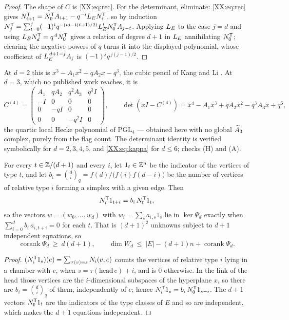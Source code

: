 \begin{proof}
The shape of $C$ is \eqref{XX:eq:rec}. For the determinant, eliminate: \eqref{XX:eq:rec} gives
$N_{i+1}^{\mathsf{T}}=N_0^{\mathsf{T}}A_{i+1}-q^{-i}L_E N_i^{\mathsf{T}}$, so by induction
$N_j^{\mathsf{T}}=\sum_{t=0}^{j}(-1)^{t}q^{-(tj-t(t+1)/2)}L_E^{t}N_0^{\mathsf{T}}A_{j-t}$. Applying $L_E$
to the case $j=d$ and using $L_E N_d^{\mathsf{T}}=q^{\,d}N_0^{\mathsf{T}}$ gives a relation of degree
$d+1$ in $L_E$ annihilating $N_0^{\mathsf{T}}$; clearing the negative powers of $q$ turns it into
the displayed polynomial, whose coefficient of $L_E^{\,d+1-j}A_j$ is
$(-1)^{j}q^{\,j(j-1)/2}$.
\end{proof}

At $d=2$ this is $x^{3}-A_1x^{2}+qA_2x-q^{3}$, the cubic pencil of Kang and Li \cite{KL14}.
At $d=3$, which no published work reaches, it is
\[
  C^{(4)}=\begin{pmatrix} A_1 & qA_2 & q^{2}A_3 & q^{3}I\\ -I&0&0&0\\ 0&-qI&0&0\\
          0&0&-q^{2}I&0\end{pmatrix},
  \qquad
  \det(xI-C^{(4)})=x^{4}-A_1x^{3}+qA_2x^{2}-q^{3}A_3x+q^{6} ,
\]
the quartic local Hecke polynomial of $\mathrm{PGL}_4$ --- obtained here with no global
$\widetilde A_{3}$ complex, purely from the flag count. The determinant identity is verified
symbolically for $d=2,3,4,5$, and \eqref{XX:eq:kappa} for $d\le6$; checks (H) and (A).

\begin{theorem}\label{XX:thm:corank}
For every $t\in\mathbb{Z}/(d+1)$ and every $i$, let $1_t\in\mathbb{Z}^{n}$ be the indicator of the vertices
of type $t$, and let $b_i=\binom{d}{i}_{\!q}=f(d)/\bigl(f(i)f(d-i)\bigr)$ be the number of
vertices of relative type $i$ forming a simplex with a given edge. Then
\[
  N_i^{\mathsf{T}}1_{t+i}=b_i\,N_0^{\mathsf{T}}1_{t},
\]
so the vectors $w=(w_0,\dots,w_d)$ with $w_i=\sum_s a_{i,s}1_s$ lie in $\ker\Psi_d$ exactly
when $\sum_{i=0}^{d}b_i\,a_{i,t+i}=0$ for each $t$. That is $(d+1)^{2}$ unknowns subject to
$d+1$ independent equations, so
\[
  \operatorname{corank}\Psi_d\ \ge\ d(d+1),
  \qquad
  \dim W_d\ \le\ |E|-(d+1)n+\operatorname{corank}\Psi_d .
\]
\end{theorem}

\begin{proof}
$(N_i^{\mathsf{T}}1_s)(e)=\sum_{\tau(v)=s}N_i(v,e)$ counts the vertices of relative type $i$ lying
in a chamber with $e$, when $s=\tau(\mathrm{head}\,e)+i$, and is $0$ otherwise. In the link
of the head those vertices are the $i$-dimensional subspaces of the hyperplane $x$, so there
are $b_i=\binom{d}{i}_q$ of them, independently of $e$; hence
$N_i^{\mathsf{T}}1_s=b_i\,N_0^{\mathsf{T}}1_{s-i}$.
The $d+1$ vectors $N_0^{\mathsf{T}}1_t$ are the indicators of the type classes of $E$ and so are
independent, which makes the $d+1$ equations independent.
\end{proof}

